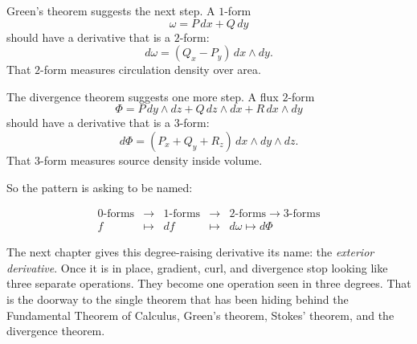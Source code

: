 Green's theorem suggests the next step.  A \(1\)-form
\[
    \omega=P\,dx+Q\,dy
\]
should have a derivative that is a \(2\)-form:
\[
    d\omega=(Q_x-P_y)\,dx\wedge dy.
\]
That \(2\)-form measures circulation density over area.

The divergence theorem suggests one more step.  A flux \(2\)-form
\[
    \Phi=P\,dy\wedge dz+Q\,dz\wedge dx+R\,dx\wedge dy
\]
should have a derivative that is a \(3\)-form:
\[
    d\Phi=(P_x+Q_y+R_z)\,dx\wedge dy\wedge dz.
\]
That \(3\)-form measures source density inside volume.

So the pattern is asking to be named:

\[
\boxed{
\begin{array}{ccccc}
0\text{-forms} & \longrightarrow & 1\text{-forms} & \longrightarrow & 2\text{-forms} \longrightarrow 3\text{-forms} \\
f & \longmapsto & df & \longmapsto & d\omega \longmapsto d\Phi
\end{array}
}
\]

The next chapter gives this degree-raising derivative its name: the \emph{exterior
derivative}.  Once it is in place, gradient, curl, and divergence stop looking like three
separate operations.  They become one operation seen in three degrees.  That is the
doorway to the single theorem that has been hiding behind the Fundamental Theorem
of Calculus, Green's theorem, Stokes' theorem, and the divergence theorem.